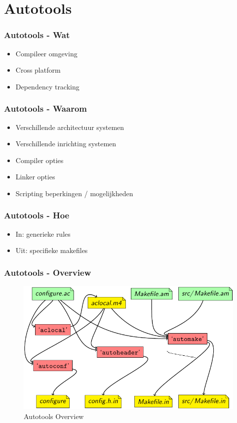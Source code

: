 \documentclass{beamer}
\begin{document}
\section{Autotools}

\begin{frame}
  \frametitle{Autotools - Wat}
  \begin{itemize}
    \item<1-> Compileer omgeving
    \item<2-> Cross platform
    \item<3-> Dependency tracking
  \end{itemize}
\end{frame}

\begin{frame}
  \frametitle{Autotools - Waarom}
  \begin{itemize}
    \item<1-> Verschillende architectuur systemen 
    \item<2-> Verschillende inrichting systemen 
    \item<3-> Compiler opties
    \item<4-> Linker opties
    \item<5-> Scripting beperkingen / mogelijkheden
  \end{itemize}
\end{frame}

\begin{frame}
  \frametitle{Autotools - Hoe}
  \begin{itemize}
    \item<1-> In: generieke rules
    \item<2-> Uit: specifieke makefiles
  \end{itemize}
\end{frame}

\begin{frame}
  \frametitle{Autotools - Overview}
  \begin{figure}[H]
    \begin{center}
      \includegraphics[scale=0.5]{images/auto_over}
    \end{center}
    \caption{Autotools Overview}
    \label{fig:auto_over}
  \end{figure}
\end{frame}
\end{document}
